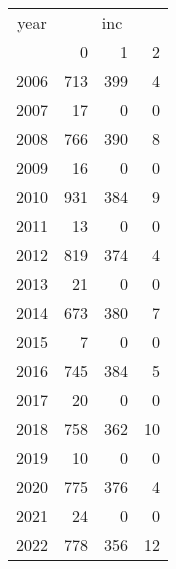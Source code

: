 \footnotesize\begin{tabular}[t]{lrrr}
\toprule
\multicolumn{1}{c}{year} & \multicolumn{3}{c}{inc} \\
\cmidrule(l{3pt}r{3pt}){1-1} \cmidrule(l{3pt}r{3pt}){2-4}
  & 0 & 1 & 2\\
\midrule
2006 & 713 & 399 & 4\\
2007 & 17 & 0 & 0\\
2008 & 766 & 390 & 8\\
2009 & 16 & 0 & 0\\
2010 & 931 & 384 & 9\\
2011 & 13 & 0 & 0\\
2012 & 819 & 374 & 4\\
2013 & 21 & 0 & 0\\
2014 & 673 & 380 & 7\\
2015 & 7 & 0 & 0\\
2016 & 745 & 384 & 5\\
2017 & 20 & 0 & 0\\
2018 & 758 & 362 & 10\\
2019 & 10 & 0 & 0\\
2020 & 775 & 376 & 4\\
2021 & 24 & 0 & 0\\
2022 & 778 & 356 & 12\\
\bottomrule
\end{tabular}
